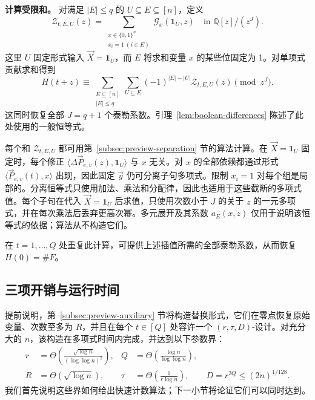 \documentclass[11pt,reqno]{amsart}
\numberwithin{equation}{section}
\theoremstyle{definition}\newtheorem{definition}[theorem]{定义}
\theoremstyle{remark}\newtheorem{remark}[theorem]{注}
\renewcommand{\le}{\leqslant}
\begin{document}
\smallskip\noindent
\textbf{计算受限和。}
对满足 $|E|\le q$ 的 $U\subseteq E\subseteq[n]$，定义
\begin{equation}\label{eq:outline-restricted-taylor-sum}
 \mathcal Z_{t,E,U}(z)=
 \sum_{\substack{x\in\{0,1\}^n\\x_i=1\ (i\in E)}}
                    \mathcal G_x(\mathbf1_U,z)
       \quad\text{in }\mathbb Q[z]/(z^J).
\end{equation}
这里 $U$ 固定形式输入 $\vec X=\mathbf1_U$，而 $E$ 将求和变量 $x$ 的某些位固定为 1。对单项式贡献求和得到
\begin{equation}\label{eq:outline-taylor-recovery}
 H(t+z)\equiv
 \sum_{\substack{E\subseteq[n]\\|E|\le q}}
       \sum_{U\subseteq E}(-1)^{|E|-|U|}
                         \mathcal Z_{t,E,U}(z)\pmod{z^J}.
\end{equation}
这同时恢复全部 $J=q+1$ 个泰勒系数。引理~\ref{lem:boolean-differences} 陈述了此处使用的一般恒等式。

每个和 $\mathcal Z_{t,E,U}$ 都可用第~\ref{subsec:preview-separation} 节的算法计算。在 $\vec X=\mathbf1_U$ 固定时，每个修正 $\langle\Delta\vec P_{e,v}(z),\mathbf1_U\rangle$ 与 $x$ 无关。对 $x$ 的全部依赖都通过形式 $\langle\vec P_{e,v}(t),x\rangle$ 出现，因此固定 $\vec y$ 仍可分离子句多项式。限制 $x_i=1$ 对每个组是局部的。分离恒等式只使用加法、乘法和分配律，因此也适用于这些截断的多项式值。每个子句在代入 $\vec X=\mathbf1_U$ 后求值，只使用次数小于 $J$ 的关于 $z$ 的一元多项式，并在每次乘法后丢弃更高次幂。多元展开及其系数 $a_E(x,z)$ 仅用于说明该恒等式的依据；算法从不构造它们。

在 $t=1,\ldots,Q$ 处重复此计算，可提供上述插值所需的全部泰勒系数，从而恢复 $H(0)=\#F$。

\subsection{三项开销与运行时间}
\label{subsec:preview-parameters}
提前说明，第~\ref{subsec:preview-auxiliary} 节将构造替换形式，它们在零点恢复原始变量、次数至多为 $R$，并且在每个 $t\in[Q]$ 处容许一个 $(r,\tau,D)$-设计。对充分大的 $n$，该构造在多项式时间内完成，并达到以下参数界：
\begin{equation}\label{eq:overview-parameter-bounds}
 \begin{aligned}
 r&=\Theta\!\left(\frac{\sqrt{\log n}}{(\log\log n)^2}\right),
 &Q&=\Theta\!\left(\frac{\log n}{\log\log n}\right),\\
 R&=\Theta(\sqrt{\log n}),
 &\tau&=\Theta\!\left(\frac1{r\log n}\right),\qquad
 D=r^{2Q}\le(2n)^{1/128}.
 \end{aligned}
\end{equation}
我们首先说明这些界如何给出快速计数算法；下一小节将论证它们可以同时达到。
\end{document}

